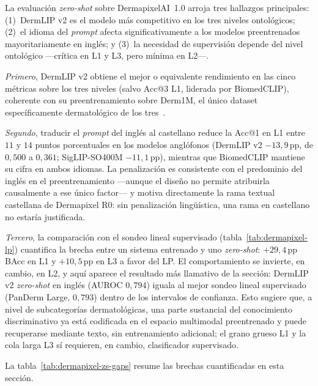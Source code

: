 La evaluación \emph{zero-shot} sobre DermapixelAI~1.0 arroja tres
hallazgos principales: (1)~DermLIP v2 es el modelo más competitivo en
los tres niveles ontológicos; (2)~el idioma del \emph{prompt} afecta
significativamente a los modelos preentrenados mayoritariamente en
inglés; y (3)~la necesidad de supervisión depende del nivel
ontológico ---crítica en L1 y L3, pero mínima en L2---.

\textit{Primero}, DermLIP v2 obtiene el mejor o equivalente
rendimiento en las cinco métricas sobre los tres niveles (salvo
Acc@3 L1, liderada por BiomedCLIP), coherente con su preentrenamiento
sobre Derm1M, el único dataset específicamente dermatológico de los
tres~\cite{derm1m}.

\textit{Segundo}, traducir el \emph{prompt} del inglés al castellano
reduce la Acc@1 en L1 entre $11$ y $14$ puntos porcentuales en los
modelos anglófonos (DermLIP v2 $-13{,}9$\,pp, de $0{,}500$ a $0{,}361$;
SigLIP-SO400M $-11{,}1$\,pp), mientras que BiomedCLIP mantiene su
cifra en ambos idiomas. La penalización es consistente con el
predominio del inglés en el preentrenamiento ---aunque el diseño no
permite atribuirla causalmente a ese único factor--- y motiva
directamente la rama textual castellana de Dermapixel R0: sin
penalización lingüística, una rama en castellano no estaría
justificada.

\textit{Tercero}, la comparación con el sondeo lineal supervisado
(tabla~\ref{tab:dermapixel-lp}) cuantifica la brecha entre un sistema
entrenado y uno \emph{zero-shot}: $+29{,}4$\,pp BAcc en L1 y
$+10{,}5$\,pp en L3 a favor del LP. El comportamiento se invierte, en
cambio, en L2, y aquí aparece el resultado más llamativo de la
sección: DermLIP v2 \emph{zero-shot} en inglés (AUROC $0{,}794$) iguala
al mejor sondeo lineal supervisado (PanDerm Large, $0{,}793$) dentro de
los intervalos de confianza. Esto sugiere que, a nivel de
subcategorías dermatológicas, una parte sustancial del conocimiento
discriminativo ya está codificada en el espacio multimodal
preentrenado y puede recuperarse mediante texto, sin entrenamiento
adicional; el grano grueso L1 y la cola larga L3 sí requieren, en
cambio, clasificador supervisado.

La tabla~\ref{tab:dermapixel-zs-gaps} resume las brechas
cuantificadas en esta sección.

